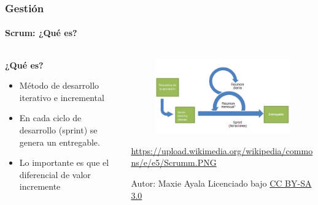 \begin{frame}
	\frametitle{Gesti\'on}
	\framesubtitle{Scrum: ¿Qu\'e es?}
	\begin{columns}[T] %
		
		\begin{column}[T]{0.5\linewidth} %
			\textbf{¿Qu\'e es?}
			\begin{itemize}
				\item M\'etodo de desarrollo iterativo e incremental
				\item En cada ciclo de desarrollo (sprint) se genera un 
				entregable.
				\item Lo importante es que el diferencial de valor incremente
			\end{itemize}
		\end{column}
		\begin{column}[T]{0.5\linewidth} %
			\begin{figure}
				\includegraphics[width=1.0\linewidth]{./Figures/Scrumm.PNG}
				\label{scrum}
			\end{figure}
			\tiny{\url{https://upload.wikimedia.org/wikipedia/commons/e/e5/Scrumm.PNG}
					
					Autor: Maxie Ayala 
					Licenciado bajo 
					\hyperlink{creativecommons.org/licenses/by-sa/3.0/}{CC 
					BY-SA 3.0}}
		\end{column}
	\end{columns}

\end{frame}

